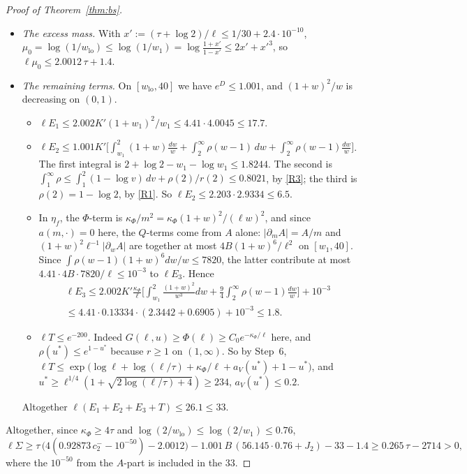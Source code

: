 \begin{proof}[Proof of Theorem~\ref{thm:bs}]
\begin{itemize}
  $\ell\int\pi\,(e^{D_\Phi}-1)\mathbf 1[w\le U(m)]\le-\ell\Phi_{\mathrm{ben}}+10^{-50}\kappa_\Phi$. Using
  $1-e^{-y}\ge y(1-y/2)$, $\kappa_\Phi/\ell\le0.13334$ and $w\ge w_1\ge29/31-10^{-8}$,
  $\Phi_{\mathrm{ben}}\ge(\kappa_\Phi/\ell)(1-\kappa_\Phi/(2w_1\ell))E_\pi[1/w]\ge0.92873\,(\kappa_\Phi/\ell)\,c_2^-$, where
  \[
    E_\pi[1/w]\ge c_2^-:=\int_1^2\frac{dw}{w^2}+\int_2^3\frac{(1-\log(w-1))\,dw}{w^2}=\frac23+\frac{\log2}3-\log\frac43\ge0.61003 .
  \]
\item \emph{The excess mass.} With $x':=(\tau+\log2)/\ell\le1/30+2.4\cdot10^{-10}$,
  $\mu_0=\log(1/w_{\mathrm{lo}})\le\log(1/w_1)=\log\frac{1+x'}{1-x'}\le2x'+x'^3$, so $\ell\mu_0\le2.0012\,\tau+1.4$.
\item \emph{The remaining terms.} On $[w_{\mathrm{lo}},40]$ we have $e^{D}\le1.001$, and $(1+w)^2/w$ is decreasing on $(0,1)$.
  \begin{itemize}
  \item $\ell E_1\le2.002K'(1+w_1)^2/w_1\le4.41\cdot4.0045\le17.7$.
  \item $\ell E_2\le1.001K'\big[\int_{w_1}^2(1+w)\frac{dw}w+\int_2^\infty\rho(w-1)\,dw+\int_2^\infty\rho(w-1)\frac{dw}w\big]$. The first
    integral is $2+\log2-w_1-\log w_1\le1.8244$. The second is $\int_1^\infty\rho\le\int_1^2(1-\log v)\,dv+\rho(2)/r(2)\le0.8021$, by
    \ref{R3}; the third is $\rho(2)=1-\log2$, by \ref{R1}. So $\ell E_2\le2.203\cdot2.9334\le6.5$.
  \item In $\eta_f$, the $\Phi$-term is $\kappa_\Phi/m^2=\kappa_\Phi(1+w)^2/(\ell w)^2$, and since $a(m,\cdot)=0$ here, the
    $Q$-terms come from $A$ alone: $|\partial_mA|=A/m$ and $(1+w)^2\ell^{-1}|\partial_wA|$ are together at most
    $4B(1+w)^6/\ell^2$ on $[w_1,40]$. Since $\int\rho(w-1)(1+w)^6dw/w\le7820$, the latter contribute at most
    $4.41\cdot4B\cdot7820/\ell\le10^{-3}$ to $\ell E_3$. Hence
    \begin{multline*}
      \ell E_3\le2.002K'\frac{\kappa_\Phi}\ell\Big[\int_{w_1}^2\frac{(1+w)^2}{w^3}dw+\frac94\int_2^\infty\rho(w-1)\frac{dw}w\Big]+10^{-3}\\
      \le4.41\cdot0.13334\cdot(2.3442+0.6905)+10^{-3}\le1.8 .
    \end{multline*}
  \item $\ell T\le e^{-200}$. Indeed $G(\ell,u)\ge\Phi(\ell)\ge C_0e^{-\kappa_\Phi/\ell}$ here, and $\rho(u^*)\le e^{1-u^*}$ because
    $r\ge1$ on $(1,\infty)$. So by Step~6,
    $\ell T\le\exp\big(\log\ell+\log(\ell/\tau)+\kappa_\Phi/\ell+a_V(u^*)+1-u^*\big)$, and
    $u^*\ge\ell^{1/4}(1+\sqrt{2\log(\ell/\tau)+4})\ge234$, $a_V(u^*)\le0.2$.
  \end{itemize}
  Altogether $\ell(E_1+E_2+E_3+T)\le26.1\le33$.
\end{itemize}
Altogether, since $\kappa_\Phi\ge4\tau$ and $\log(2/w_{\mathrm{lo}})\le\log(2/w_1)\le0.76$,
\[
  \ell\Sigma\ge\tau\,\big(4(0.92873\,c_2^--10^{-50})-2.0012\big)-1.001\,B\,(56.145\cdot0.76+J_2)-33-1.4\ge0.265\,\tau-2714>0 ,
\]
where the $10^{-50}$ from the $A$-part is included in the $33$.


\end{proof}
